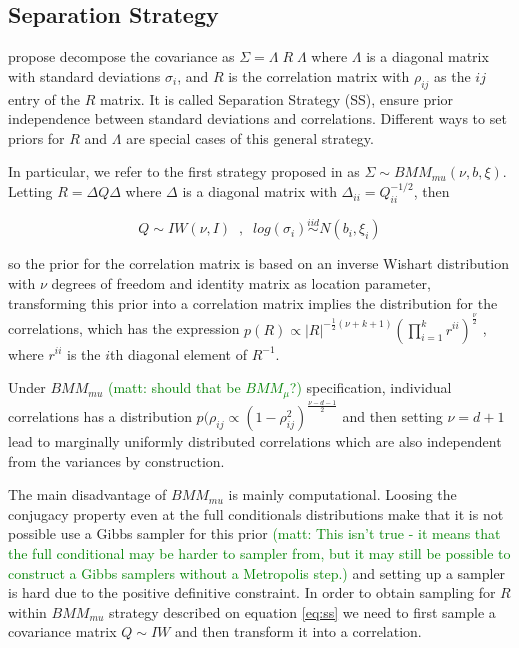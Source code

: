 \documentclass[a4paper]{article}
\newcommand{\matt}[1]{\textcolor{green}{(matt: #1)}}
\begin{document}
\subsection{Separation Strategy \label{ss.sec} }

\cite{barnard2000} propose decompose the covariance as $\Sigma = \Lambda \; R \; \Lambda$  where $\Lambda$ is a diagonal matrix with  standard deviations $\sigma_{i}$, and $R$ is the correlation matrix with $\rho_{ij}$  as the $ij$ entry of the $R$ matrix. It is called Separation Strategy (SS), ensure prior independence between standard deviations and correlations.  Different ways to set priors for $R$ and $\Lambda$ are special cases of this general strategy. 

In particular, we refer to the first strategy proposed in \cite{barnard2000} as $\Sigma \sim BMM_{mu}(\nu,b,\xi)$.  Letting $R = \Delta Q \Delta$ where $\Delta$ is a diagonal matrix with $\Delta_{ii} = Q_{ii}^{-1/2}$, then 

\begin{equation}
Q \sim IW(\nu, I ) \;\;, \;\;  log(\sigma_i) \stackrel{iid} \sim N(b_i, \xi_i)
\label{eq:ss}
\end{equation} 

so the prior for the correlation matrix is based on an inverse Wishart distribution with $\nu$ degrees of freedom and identity matrix as location parameter, transforming this prior into a correlation matrix implies the distribution for the correlations, which has the expression  $p(R) \propto |R|^{-\frac{1}{2}(\nu+k+1) }  (\prod_{i=1}^k r^{ii}) ^{\frac{\nu}{2}}$ , where $r^{ii}$ is the $i$th diagonal element of $R^{-1}$. 

Under $BMM_{mu}$ \matt{should that be $BMM_{\mu}$?} specification, individual correlations has a distribution $p(\rho_{ij} \propto (1-\rho_{ij}^2)^{\frac{\nu-d-1}{2}}$ and then setting $\nu=d+1$ lead to marginally uniformly distributed correlations which are also independent from the variances by construction. 

The main disadvantage of $BMM_{mu}$ is mainly computational. Loosing the conjugacy property even at the full conditionals distributions make that it is not possible use a Gibbs sampler for this prior \matt{This isn't true - it means that the full conditional may be harder to sampler from, but it may still be possible to construct a Gibbs samplers without a Metropolis step.} and setting up a sampler is hard due to the positive definitive constraint. In order to obtain sampling for $R$ within $BMM_{mu}$ strategy described on equation \eqref{eq:ss} we need to first sample a covariance matrix $Q \sim IW$ and then transform it  into a correlation. 
\end{document}
